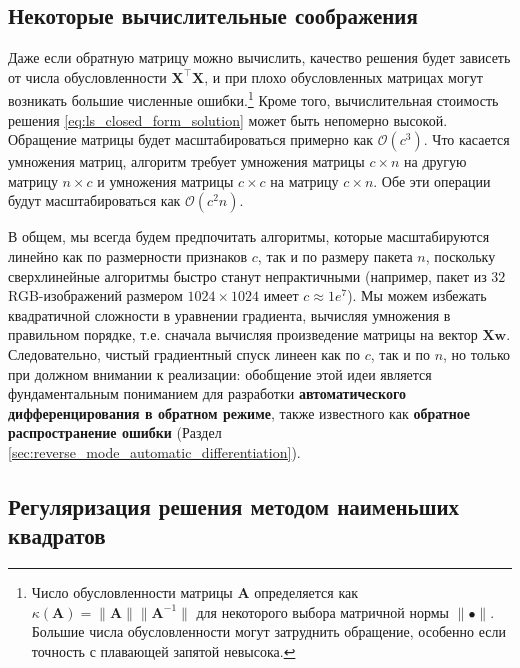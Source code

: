 \subsection{Некоторые вычислительные соображения}

\addteacup Даже если обратную матрицу можно вычислить, качество решения будет зависеть от числа обусловленности $\mathbf{X}^\top\mathbf{X}$, и при плохо обусловленных матрицах могут возникать большие численные ошибки.\footnote{Число обусловленности матрицы $\mathbf{A}$ определяется как $\kappa(\mathbf{A}) = \lVert\mathbf{A}\rVert\lVert\mathbf{A}^{-1}\rVert$ для некоторого выбора матричной нормы $\lVert \bullet \rVert$. Большие числа обусловленности могут затруднить обращение, особенно если точность с плавающей запятой невысока.} Кроме того, вычислительная стоимость решения \eqref{eq:ls_closed_form_solution} может быть непомерно высокой. Обращение матрицы будет масштабироваться примерно как $\mathcal{O}(c^3)$. Что касается умножения матриц, алгоритм требует умножения матрицы $c \times n$ на другую матрицу $n \times c$ и умножения матрицы $c \times c$ на матрицу $c \times n$. Обе эти операции будут масштабироваться как $\mathcal{O}(c^2n)$.

В общем, мы всегда будем предпочитать алгоритмы, которые масштабируются линейно как по размерности признаков $c$, так и по размеру пакета $n$, поскольку сверхлинейные алгоритмы быстро станут непрактичными (например, пакет из $32$ RGB-изображений размером $1024 \times 1024$ имеет $c \approx 1e^{7}$). Мы можем избежать квадратичной сложности в уравнении градиента, вычисляя умножения в правильном порядке, т.е. сначала вычисляя произведение матрицы на вектор $\mathbf{X}\mathbf{w}$. Следовательно, чистый градиентный спуск линеен как по $c$, так и по $n$, но только при должном внимании к реализации: обобщение этой идеи является фундаментальным пониманием для разработки \textbf{автоматического дифференцирования в обратном режиме}, также известного как \textbf{обратное распространение ошибки} (Раздел \ref{sec:reverse_mode_automatic_differentiation}).

\subsection{Регуляризация решения методом наименьших квадратов}
\label{subsec:regularizing_least_squares}

